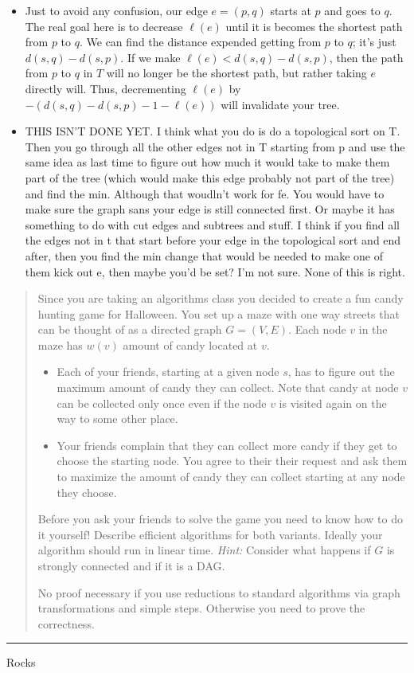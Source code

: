 \documentclass[11pt]{article}
\begin{document}
\begin{solution}
    \begin{itemize}
        \item Just to avoid any confusion, our edge $e = (p, q)$ starts at $p$ and goes to $q$. The real goal here is to decrease $\ell(e)$ until it is becomes the shortest path from $p$ to $q$. We can find the distance expended getting from $p$ to $q$; it's just $d(s, q) - d(s, p)$. If we make $\ell(e) < d(s, q) - d(s, p)$, then the path from $p$ to $q$ in $T$ will no longer be the shortest path, but rather taking $e$ directly will. Thus, decrementing $\ell(e)$ by $-(d(s, q) - d(s, p) - 1 - \ell(e))$ will invalidate your tree.
        \item THIS ISN'T DONE YET. I think what you do is do a topological sort on T. Then you go through all the other edges not in T starting from p and use the same idea as last time to figure out how much it would take to make them part of the tree (which would make this edge probably not part of the tree) and find the min. Although that woudln't work for fe. You would have to make sure the graph sans your edge is still connected first. Or maybe it has something to do with cut edges and subtrees and stuff. I think if you find all the edges not in t that start before your edge in the topological sort and end after, then you find the min change that would be needed to make one of them kick out e, then maybe you'd be set? I'm not sure. None of this is right.
    \end{itemize}
\end{solution}


\begin{quote}
Since you are taking an algorithms class you decided to create a
  fun candy hunting game for Halloween. You set up a maze with one
  way streets that can be thought of as a directed graph
  $G=(V,E)$. Each node $v$ in the maze has $w(v)$ amount of candy
  located at $v$.
  \begin{itemize}
  \item Each of your friends, starting at a given node $s$, has to
    figure out the maximum amount of candy they can collect. Note that
    candy at node $v$ can be collected only once even if the node $v$
    is visited again on the way to some other place.
  \item Your friends complain that they can collect more candy if they
    get to choose the starting node. You agree to their their request
    and ask them to maximize the amount of candy they can collect
    starting at any node they choose.
  \end{itemize}
  Before you ask your friends to solve the game you need to know how
  to do it yourself!  Describe efficient algorithms for both variants.
  Ideally your algorithm should run in linear time.
  {\em Hint:} Consider what happens if $G$ is strongly connected and
  if it is a DAG.

  No proof necessary if you use reductions to standard algorithms via
  graph transformations and simple steps. Otherwise you need to prove
  the correctness.
\end{quote}
\hrule



\begin{solution}
    Rocks
\end{solution}
\end{document}
